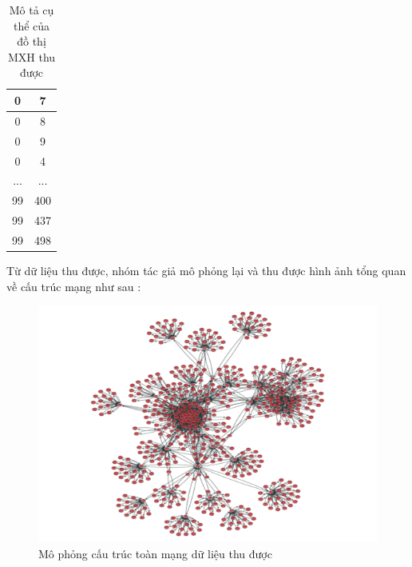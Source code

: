 		 \begin{table} [!htp]
		 	\centering
		 	\begin{tabular}{|c|c|}
		 	\hline 
		 	0 & 7 \\ 
		 	\hline 
		 	0 & 8 \\ 
		 	\hline 
		 	0 & 9 \\ 
		 	\hline 
		 	0 & 4 \\ 
		 	\hline 
		 	... & ... \\ 
		 	\hline 
		 	99 & 400 \\ 
		 	\hline 
		 	99 & 437 \\ 
		 	\hline 
		 	99 & 498 \\ 
		 	\hline 
		 	\end{tabular}
	 		\caption{Mô tả cụ thể của đồ thị MXH thu được}
	 		\label{bang3_2} 
		 \end{table}
	 
	 	Từ dữ liệu thu được, nhóm tác giả mô phỏng lại và thu được hình ảnh tổng quan về cấu trúc mạng như sau :
	 
	 	\begin{center}
	 		\begin{figure}[htp]
	 			\begin{center}
	 				\includegraphics [scale=.5]{picture/Hinh3_2}
	 			\end{center}
	 			\caption{Mô phỏng cấu trúc toàn mạng dữ liệu thu được}
	 			\label{refhinh3_2}
	 		\end{figure}
	 	\end{center}
